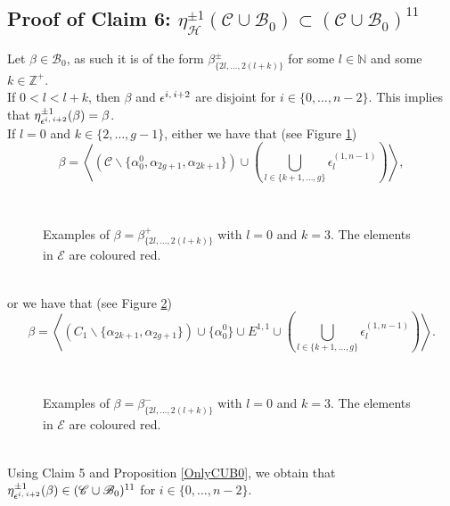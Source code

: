 \documentclass[twoside,11pt,a4paper]{article}
\newcommand*{\nat}{\mathbb{N}}
\newcommand*{\Cf}{\mathscr{C}}
\newcommand*{\Bf}{\mathscr{B}}
\newcommand*{\Ef}{\mathscr{E}}
\newcommand*{\Hff}{\mathscr{H}}
\newcommand*{\eps}[2]{\epsilon^{#1, \hspace{0.05cm} #2}}
\newcommand*{\epsp}[3]{\epsilon_{#1}^{(#2,#3)}}
\begin{document}
\subsection{Proof of Claim 6: $\eta_{\Hff}^{\pm 1}(\Cf \cup \Bf_{0}) \subset (\Cf \cup \Bf_{0})^{11}$}\label{chap2sec9}
\indent Let $\beta \in \Bf_{0}$, as such it is of the form $\beta_{\{2l, \ldots, 2(l+k)\}}^{\pm}$ for some $l \in \nat$ and some $k \in \mathbb{Z}^{+}$.\\
\indent If $0 < l < l+k$, then $\beta$ and $\eps{i}{i+2}$ are disjoint for $i \in \{0, \ldots, n-2\}$. This implies that $\eta_{\eps{i}{i+2}}^{\pm 1}(\beta) = \beta$.\\
\indent If $l = 0$ and $k \in \{2, \ldots, g-1\}$, either we have that (see Figure \ref{ExamplesChap2Claim6Fig1}) $$\beta = \left\langle (\Cf \backslash \{\alpha_{0}^{0}, \alpha_{2g+1}, \alpha_{2k+1}\}) \cup \left(\bigcup_{l \in \{k+1, \ldots, g\}} \epsp{l}{1}{n-1}\right)\right\rangle,$$
\begin{figure}[h]
 \begin{center}
  \resizebox{9cm}{!}{} \\[0.2cm]
  \resizebox{9cm}{!}{} \caption{Examples of $\beta = \beta_{\{2l, \ldots, 2(l+k)\}}^{+}$ with $l = 0$ and $k = 3$. The elements in $\Ef$ are coloured red.} \label{ExamplesChap2Claim6Fig1}
 \end{center}
\end{figure}\\
or we have that (see Figure \ref{ExamplesChap2Claim6Fig3}) $$\beta = \left\langle (C_{1} \backslash \{\alpha_{2k+1}, \alpha_{2g+1}\}) \cup \{\alpha_{0}^{0}\} \cup E^{1,1} \cup \left(\bigcup_{l \in \{k+1, \ldots, g\}} \epsp{l}{1}{n-1}\right)\right\rangle.$$ 
\begin{figure}[h]
 \begin{center}
  \resizebox{9cm}{!}{} \\[0.2cm]
  \resizebox{9cm}{!}{} \caption{Examples of $\beta = \beta_{\{2l, \ldots, 2(l+k)\}}^{-}$ with $l = 0$ and $k = 3$. The elements in $\Ef$ are coloured red.} \label{ExamplesChap2Claim6Fig3}
 \end{center}
\end{figure}\\
\indent Using Claim 5 and Proposition \ref{OnlyCUB0}, we obtain that $\eta_{\eps{i}{i+2}}^{\pm 1}(\beta) \in (\Cf \cup \Bf_{0})^{11}$ for $i \in \{0, \ldots, n-2\}$.\\
\end{document}
